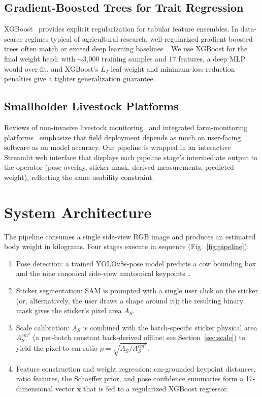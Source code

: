 \documentclass[conference]{IEEEtran}
\begin{document}
\subsection{Gradient-Boosted Trees for Trait Regression}

XGBoost~\cite{chen2016} provides explicit regularization for tabular feature ensembles. In data-scarce regimes typical of agricultural research, well-regularized gradient-boosted trees often match or exceed deep learning baselines~\cite{nguyen2022,alvarez2023}. We use XGBoost for the final weight head: with $\sim$3,000 training samples and 17 features, a deep MLP would over-fit, and XGBoost's $L_2$ leaf-weight and minimum-loss-reduction penalties give a tighter generalization guarantee.

\subsection{Smallholder Livestock Platforms}

Reviews of non-invasive livestock monitoring~\cite{vyas2021} and integrated farm-monitoring platforms~\cite{porto2023} emphasize that field deployment depends as much on user-facing software as on model accuracy. Our pipeline is wrapped in an interactive Streamlit web interface that displays each pipeline stage's intermediate output to the operator (pose overlay, sticker mask, derived measurements, predicted weight), reflecting the same usability constraint.

\section{System Architecture}
\label{sec:arch}

The pipeline consumes a single side-view RGB image and produces an estimated body weight in kilograms. Four stages execute in sequence (Fig.~\ref{fig:pipeline}):

\begin{enumerate}
    \item Pose detection: a trained YOLOv8s-pose model predicts a cow bounding box and the nine canonical side-view anatomical keypoints~\cite{kaggle_acme_bmgf}.
    \item Sticker segmentation: SAM is prompted with a single user click on the sticker (or, alternatively, the user draws a shape around it); the resulting binary mask gives the sticker's pixel area $A_S$.
    \item Scale calibration: $A_S$ is combined with the batch-specific sticker physical area $A_S^{cm^2}$ (a per-batch constant back-derived offline; see Section~\ref{sec:scale}) to yield the pixel-to-cm ratio $\rho = \sqrt{A_S / A_S^{cm^2}}$.
    \item Feature construction and weight regression: cm-grounded keypoint distances, ratio features, the Schaeffer prior, and pose confidence summaries form a 17-dimensional vector $\mathbf{x}$ that is fed to a regularized XGBoost regressor.
\end{enumerate}
\end{document}
